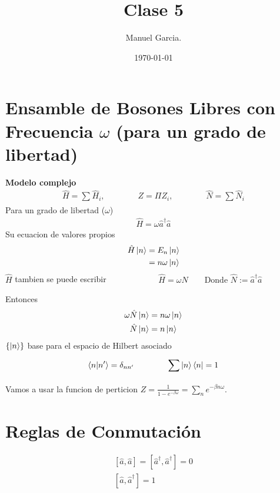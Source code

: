 \documentclass{article}
\title{Clase 5 }
\author{Manuel Garcia.}
\date{\today}
\begin{document}
\maketitle

\section{Ensamble de Bosones Libres con Frecuencia $ \omega $ (para un grado de libertad)}
\textbf{Modelo complejo }
\begin{gather*}
  \hat H = \displaystyle\sum_{}^{}\hat H_i, \qquad \qquad Z = \Pi Z_i, \qquad \qquad \hat N = \displaystyle\sum_{}^{} \hat N_i  
\end{gather*}
Para un grado de libertad ($ \omega $)
\begin{gather*}
  \hat H = \omega \hat a ^\dagger \hat a
\end{gather*}
Su ecuacion de valores propios 
\begin{align*}
  \hat H \ket{n } &= E_n \ket{n } \\
                  &= n\omega \ket{n }
\end{align*}
$ \hat H  $ tambien se puede escribir $\qquad \qquad \qquad \hat H = \omega \hat N \qquad \text{Donde } \hat N := \hat a^\dagger \hat a  $ 

\hfill 

Entonces 
\begin{align*}
  \omega\hat N \ket{n } &= n \omega \ket{n }\\
  \hat N \ket{n } &= n \ket{n }
\end{align*}
$ \{\ket{n }\} $ base para el espacio de Hilbert asociado 
\begin{gather*}
  \bra{n }\ket{n' } = \delta _{n n' } \qquad \qquad \sum_{}^{} \ket{n } \bra{n } = 1  
\end{gather*}
Vamos a usar la funcion de perticion $ Z = \frac{1}{1 - e ^ {-\beta \omega}} = \displaystyle\sum_{n }^{} e ^ {- \beta n \omega}$.




\section{Reglas de Conmutación }
\begin{gather*}
  \left[ \hat a , \hat a  \right] = \left[ \hat a^\dagger  , \hat a ^\dagger  \right] = 0 \\
  \left[ \hat a  , \hat a ^\dagger   \right] = 1 
\end{gather*}
\end{document}
